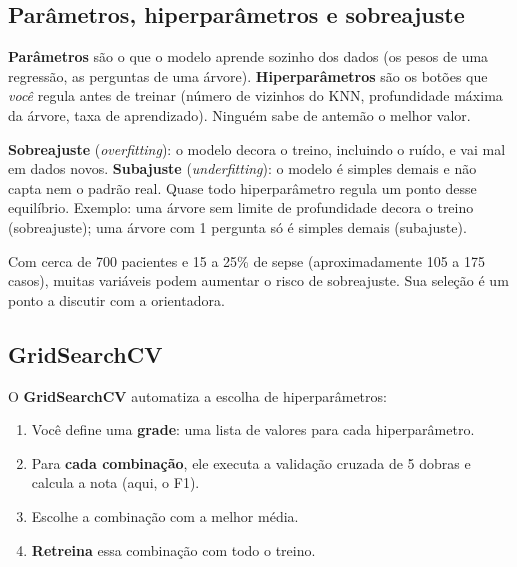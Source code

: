 \documentclass[11pt,a4paper]{article}
\begin{document}
\subsection{Parâmetros, hiperparâmetros e sobreajuste}

\begin{conceito}
\textbf{Parâmetros} são o que o modelo aprende sozinho dos dados (os pesos de uma regressão, as perguntas de uma árvore).
\textbf{Hiperparâmetros} são os botões que \emph{você} regula antes de treinar (número de vizinhos do KNN, profundidade máxima da árvore, taxa
de aprendizado). Ninguém sabe de antemão o melhor valor.
\end{conceito}

\begin{conceito}
\textbf{Sobreajuste} (\emph{overfitting}): o modelo decora o treino, incluindo o ruído, e vai mal em dados novos. \textbf{Subajuste} (\emph{underfitting}): o modelo é simples demais e não capta nem o padrão real.
Quase todo hiperparâmetro regula um ponto desse equilíbrio. Exemplo: uma árvore sem limite de profundidade decora o treino (sobreajuste);
uma árvore com 1 pergunta só é simples demais (subajuste).
\end{conceito}

\begin{atencao}
Com cerca de 700 pacientes e 15 a 25\% de sepse (aproximadamente 105 a 175 casos), muitas variáveis podem aumentar o risco de sobreajuste. Sua seleção é um ponto a discutir com a orientadora.
\end{atencao}

\subsection{GridSearchCV}

\begin{conceito}
O \textbf{GridSearchCV} automatiza a escolha de hiperparâmetros:
\begin{enumerate}
  \item Você define uma \textbf{grade}: uma lista de valores para cada hiperparâmetro.
  \item Para \textbf{cada combinação}, ele executa a validação cruzada de 5 dobras e calcula a nota (aqui, o F1).
  \item Escolhe a combinação com a melhor média.
  \item \textbf{Retreina} essa combinação com todo o treino.
\end{enumerate}
\end{conceito}
\end{document}
